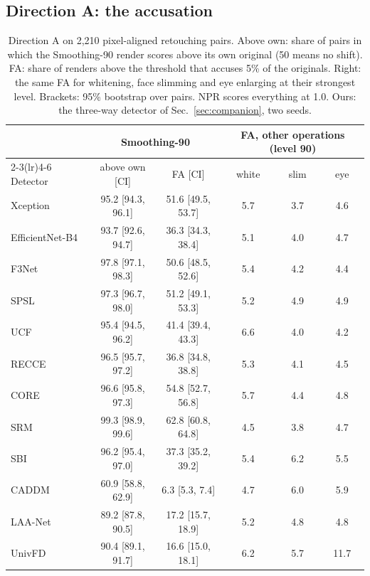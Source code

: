 \documentclass[conference]{IEEEtran}
\begin{document}
\subsection{Direction A: the accusation}
\label{sec:accuse}
\begin{table}[t]
\centering
\caption{Direction A on 2,210 pixel-aligned retouching pairs. Above own: share of pairs in which the Smoothing-90 render
scores above its own original (50 means no shift). FA: share of renders above the threshold that accuses 5\% of the
originals. Right: the same FA for whitening, face slimming and eye enlarging at their strongest level. Brackets: 95\%
bootstrap over pairs. NPR scores everything at 1.0. Ours: the three-way detector of Sec.~\ref{sec:companion}, two seeds.}
\label{tab:dirA}
\scriptsize
\setlength{\tabcolsep}{2.5pt}
\begin{tabular}{@{}l cc ccc@{}}
\toprule
 & \multicolumn{2}{c}{Smoothing-90} & \multicolumn{3}{c}{FA, other operations (level 90)} \\
\cmidrule(lr){2-3}\cmidrule(lr){4-6}
Detector & above own [CI] & FA [CI] & white & slim & eye \\
\midrule
Xception & 95.2 [94.3, 96.1] & 51.6 [49.5, 53.7] & 5.7 & 3.7 & 4.6 \\
EfficientNet-B4 & 93.7 [92.6, 94.7] & 36.3 [34.3, 38.4] & 5.1 & 4.0 & 4.7 \\
F3Net & 97.8 [97.1, 98.3] & 50.6 [48.5, 52.6] & 5.4 & 4.2 & 4.4 \\
SPSL & 97.3 [96.7, 98.0] & 51.2 [49.1, 53.3] & 5.2 & 4.9 & 4.9 \\
UCF & 95.4 [94.5, 96.2] & 41.4 [39.4, 43.3] & 6.6 & 4.0 & 4.2 \\
RECCE & 96.5 [95.7, 97.2] & 36.8 [34.8, 38.8] & 5.3 & 4.1 & 4.5 \\
CORE & 96.6 [95.8, 97.3] & 54.8 [52.7, 56.8] & 5.7 & 4.4 & 4.8 \\
SRM & 99.3 [98.9, 99.6] & 62.8 [60.8, 64.8] & 4.5 & 3.8 & 4.7 \\
SBI & 96.2 [95.4, 97.0] & 37.3 [35.2, 39.2] & 5.4 & 6.2 & 5.5 \\
CADDM & 60.9 [58.8, 62.9] & 6.3 [5.3, 7.4] & 4.7 & 6.0 & 5.9 \\
LAA-Net & 89.2 [87.8, 90.5] & 17.2 [15.7, 18.9] & 5.2 & 4.8 & 4.8 \\
UnivFD & 90.4 [89.1, 91.7] & 16.6 [15.0, 18.1] & 6.2 & 5.7 & 11.7 \\

\end{tabular}
\end{table}
\end{document}
